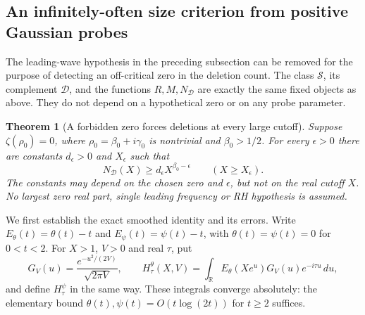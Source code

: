 \documentclass[11pt]{article}
\newtheorem{theorem}{Theorem}[section]
\theoremstyle{definition}
\begin{document}
\subsection{An infinitely-often size criterion from positive Gaussian probes}
\label{sec:greedy-prime-Gaussian-liminf}

The leading-wave hypothesis in the preceding subsection can be removed
for the purpose of detecting an off-critical zero in the deletion count.
The class $\mathcal S$, its complement $\mathcal D$, and the functions
$R,M,N_{\mathcal D}$ are exactly the same fixed objects as above.
They do not depend on a hypothetical zero or on any probe parameter.

\begin{theorem}[A forbidden zero forces deletions at every large cutoff]
\label{thm:greedy-prime-uniform-zero-response}
Suppose $\zeta(\rho_0)=0$, where
$\rho_0=\beta_0+i\gamma_0$ is nontrivial and $\beta_0>1/2$.
For every $\epsilon>0$ there are constants $d_\epsilon>0$ and
$X_\epsilon$ such that
\begin{equation}
 N_{\mathcal D}(X)\ge d_\epsilon X^{\beta_0-\epsilon}
                         \qquad(X\ge X_\epsilon).
 \label{eq:greedy-prime-uniform-zero-response}
\end{equation}
The constants may depend on the chosen zero and $\epsilon$, but not on
the real cutoff $X$.
No largest zero real part, single leading frequency or RH hypothesis
is assumed.
\end{theorem}

We first establish the exact smoothed identity and its errors.
Write $E_\theta(t)=\theta(t)-t$ and $E_\psi(t)=\psi(t)-t$,
with $\theta(t)=\psi(t)=0$ for $0<t<2$.
For $X>1$, $V>0$ and real $\tau$, put
\begin{equation}
 G_V(u)=\frac{e^{-u^2/(2V)}}{\sqrt{2\pi V}},
 \qquad
 H_\tau^\theta(X,V)=
   \int_{\mathbb R}E_\theta(Xe^u)G_V(u)e^{-i\tau u}\,du,
 \label{eq:greedy-prime-Gaussian-probe}
\end{equation}
and define $H_\tau^\psi$ in the same way.
These integrals converge absolutely: the elementary bound
$\theta(t),\psi(t)=O(t\log(2t))$ for $t\ge2$ suffices.
\end{document}
